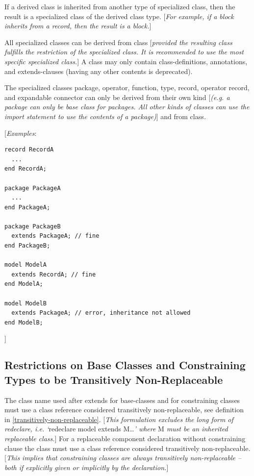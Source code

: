 \documentclass[10pt,a4paper]{report}
\def\doublelabel#1{\label{#1}}
\begin{document}
If a derived class is inherited from another type of specialized class,
then the result is a specialized class of the derived class type.
{[}\emph{For example, if a block inherits from a record, then the result
is a block.}{]}

All specialized classes can be derived from class {[}\emph{provided the
resulting class fulfills the restriction of the specialized class. It is
recommended to use the most specific specialized class.}{]} A class may
only contain class-definitions, annotations, and extends-clauses (having
any other contents is deprecated).

The specialized classes package, operator, function, type, record,
operator record, and expandable connector can only be derived from their
own kind {[}\emph{(e.g. a package can only be base class for packages.
All other kinds of classes can use the import statement to use the
contents of a package)}{]} and from class\emph{.}

{[}\emph{Examples}:
\begin{lstlisting}[language=modelica]
record RecordA
  ...
end RecordA;

package PackageA
  ...
end PackageA;

package PackageB
  extends PackageA; // fine
end PackageB;

model ModelA
  extends RecordA; // fine
end ModelA;

model ModelB
  extends PackageA; // error, inheritance not allowed
end ModelB;
\end{lstlisting}
{]}

\subsection{Restrictions on Base Classes and Constraining Types to be Transitively Non-Replaceable}\doublelabel{restrictions-on-base-classes-and-constraining-types-to-be-transitively-non-replaceable}

The class name used after extends for base-classes and for constraining
classes must use a class reference considered transitively
non-replaceable, see definition in \ref{transitively-non-replaceable}. {[}\emph{This
formulation excludes the long form of redeclare, i.e. `}redeclare model
extends M\ldots{}\emph{' where} M \emph{must be an inherited replaceable
class.}{]} For a replaceable component declaration without constraining
clause the class must use a class reference considered transitively
non-replaceable. {[}\emph{This implies that constraining classes are
always transitively non-replaceable -- both if explicitly given or
implicitly by the declaration.}{]}
\end{document}
